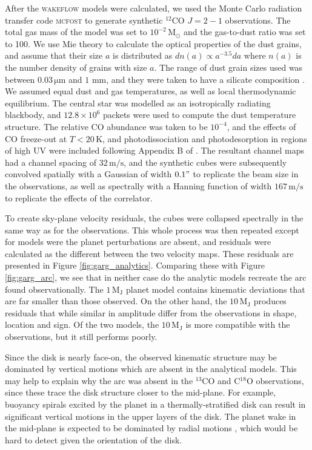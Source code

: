 After the \textsc{wakeflow} models were calculated, we used the Monte Carlo radiation transfer code \textsc{mcfost} \citep{pinte2006,pinte2009} to generate synthetic $^{12}$CO $J=2-1$ observations.
The total gas mass of the model was set to $10^{-2} \, \mathrm{M_\odot}$ \citep{toci2019} and the gas-to-dust ratio was set to 100.
We use Mie theory \citep{mie1908} to calculate the optical properties of the dust grains, and assume that their size $a$ is distributed as $dn(a) \propto a^{-3.5} da$ where $n(a)$ is the number density of grains with size $a$.
The range of dust grain sizes used was between $0.03 \, \mathrm{\mu m}$ and $1$ mm, and they were taken to have a silicate composition \citep{weingartner2001}.
We assumed equal dust and gas temperatures, as well as local thermodynamic equilibrium.
The central star was modelled as an isotropically radiating blackbody, and $12.8\times 10^6$ packets were used to compute the dust temperature structure.
The relative CO abundance was taken to be $10^{-4}$, and the effects of CO freeze-out at $T < 20\, \mathrm{K}$, and photodissociation and photodesorption in regions of high UV were included following Appendix B of \citet{pinte2018}.
The resultant channel maps had a channel spacing of $32 \, \mathrm{m/s}$, and the synthetic cubes were subsequently convolved spatially with a Gaussian of width $0.1"$ to replicate the beam size in the observations, as well as spectrally with a Hanning function of width $167 \, \mathrm{m/s}$ to replicate the effects of the correlator.

To create sky-plane velocity residuals, the cubes were collapsed spectrally in the same way as for the observations.
This whole process was then repeated except for models were the planet perturbations are absent, and residuals were calculated as the different between the two velocity maps.
These residuals are presented in Figure \ref{fig:garg_analytics}.
Comparing these with Figure \ref{fig:garg_arc}, we see that in neither case do the analytic models recreate the arc found observationally.
The $1 \, \mathrm{M_J}$ planet model contains kinematic deviations that are far smaller than those observed.
On the other hand, the $10 \, \mathrm{M_J}$ produces residuals that while similar in amplitude differ from the observations in shape, location and sign.
Of the two models, the $10 \, \mathrm{M_J}$ is more compatible with the observations, but it still performs poorly.

Since the disk is nearly face-on, the observed kinematic structure may be dominated by vertical motions which are absent in the analytical models.
This may help to explain why the arc was absent in the $^{13}$CO and C$^{18}$O observations, since these trace the disk structure closer to the mid-plane.
For example, buoyancy spirals \citep{zhu2012,bae2021} excited by the planet in a thermally-stratified disk can result in significant vertical motions in the upper layers of the disk.
The planet wake in the mid-plane is expected to be dominated by radial motions \citep{rafikov2002a}, which would be hard to detect given the orientation of the disk.

